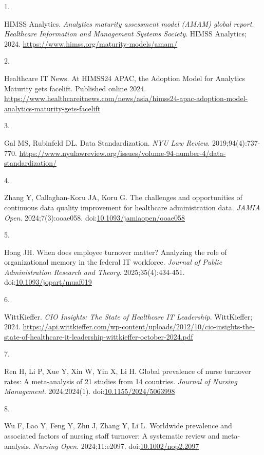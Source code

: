 \documentclass[
  american,
  11pt,
  letterpaper,
  oneside  ,captions=tableheading
]{scrartcl}
\newlength{\cslhangindent}
\newlength{\csllabelwidth}
\newenvironment{CSLReferences}[2] %
 {\begin{list}{}{%
  \setlength{\itemindent}{0pt}
  \setlength{\leftmargin}{0pt}
  \setlength{\parsep}{0pt}
  \ifodd #1
   \setlength{\leftmargin}{\cslhangindent}
   \setlength{\itemindent}{-1\cslhangindent}
  \fi
  \setlength{\itemsep}{#2\baselineskip}}}
 {\end{list}}
\newcommand{\CSLLeftMargin}[1]{\parbox[t]{\csllabelwidth}{\strut#1\strut}}
\newcommand{\CSLRightInline}[1]{\parbox[t]{\linewidth - \csllabelwidth}{\strut#1\strut}}
\begin{document}
\protect{}\label{refs}
\begin{CSLReferences}{0}{1}
\CSLLeftMargin{1. }%
\CSLRightInline{HIMSS Analytics. \emph{{Analytics maturity assessment
model (AMAM) global report. Healthcare Information and Management
Systems Society}}. {HIMSS Analytics}; 2024.
\url{https://www.himss.org/maturity-models/amam/}}

\CSLLeftMargin{2. }%
\CSLRightInline{Healthcare IT News. {At HIMSS24 APAC, the Adoption Model
for Analytics Maturity gets facelift}. Published online 2024.
\url{https://www.healthcareitnews.com/news/asia/himss24-apac-adoption-model-analytics-maturity-gets-facelift}}

\CSLLeftMargin{3. }%
\CSLRightInline{Gal MS, Rubinfeld DL. {Data Standardization}. \emph{NYU
Law Review}. 2019;94(4):737-770.
\url{https://www.nyulawreview.org/issues/volume-94-number-4/data-standardization/}}

\CSLLeftMargin{4. }%
\CSLRightInline{Zhang Y, Callaghan-Koru JA, Koru G. {The challenges and
opportunities of continuous data quality improvement for healthcare
administration data}. \emph{JAMIA Open}. 2024;7(3):ooae058.
doi:\href{https://doi.org/10.1093/jamiaopen/ooae058}{10.1093/jamiaopen/ooae058}}

\CSLLeftMargin{5. }%
\CSLRightInline{Hong JH. When does employee turnover matter? Analyzing
the role of organizational memory in the federal IT workforce.
\emph{Journal of Public Administration Research and Theory}.
2025;35(4):434-451.
doi:\href{https://doi.org/10.1093/jopart/muaf019}{10.1093/jopart/muaf019}}

\CSLLeftMargin{6. }%
\CSLRightInline{WittKieffer. \emph{{CIO Insights: The State of
Healthcare IT Leadership}}. WittKieffer; 2024.
\url{https://api.wittkieffer.com/wp-content/uploads/2012/10/cio-insights-the-state-of-healthcare-it-leadership-wittkieffer-october-2024.pdf}}

\CSLLeftMargin{7. }%
\CSLRightInline{Ren H, Li P, Xue Y, Xin W, Yin X, Li H. {Global
prevalence of nurse turnover rates: A meta-analysis of 21 studies from
14 countries}. \emph{Journal of Nursing Management}. 2024;2024(1).
doi:\href{https://doi.org/10.1155/2024/5063998}{10.1155/2024/5063998}}

\CSLLeftMargin{8. }%
\CSLRightInline{Wu F, Lao Y, Feng Y, Zhu J, Zhang Y, Li L. {Worldwide
prevalence and associated factors of nursing staff turnover: A
systematic review and meta-analysis}. \emph{Nursing Open}.
2024;11:e2097.
doi:\href{https://doi.org/10.1002/nop2.2097}{10.1002/nop2.2097}}


\end{CSLReferences}
\end{document}
